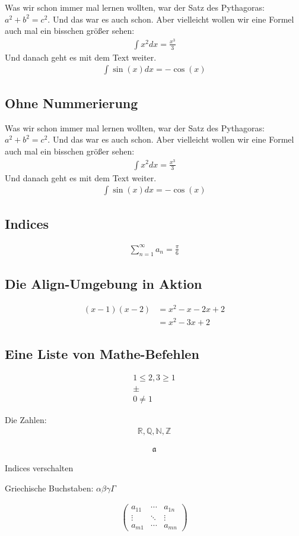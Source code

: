 \documentclass[a4paper,ngerman]{scrartcl} %
\begin{document}
Was wir schon immer mal lernen wollten, war der Satz des Pythagoras: $a^2+b^2=c^2$. Und das war es auch schon. Aber vielleicht wollen wir eine Formel auch mal ein bisschen größer sehen:
\begin{align}
\int x^2 dx = \frac{x^3}{3} 
\end{align}
Und danach geht es mit dem Text weiter.
\blindtext
\begin{align}
\int \sin (x) dx = - \cos(x)
\end{align}

\subsection{Ohne Nummerierung}

Was wir schon immer mal lernen wollten, war der Satz des Pythagoras: $a^2+b^2=c^2$. Und das war es auch schon. Aber vielleicht wollen wir eine Formel auch mal ein bisschen größer sehen:
\begin{align*}
\int x^2 dx = \frac{x^3}{3} 
\end{align*}
Und danach geht es mit dem Text weiter.
\blindtext
\begin{align*}
\int \sin (x) dx = - \cos(x)
\end{align*}

\subsection{Indices}
\begin{align}
\sum_{n=1}^\infty a_n = \frac{\pi}{6}
\end{align}


\subsection{Die Align-Umgebung in Aktion}
\begin{align}
(x-1)(x-2) &= x^2-x-2x+2\\
&= x^2-3x+2
\end{align} 

\subsection{Eine Liste von Mathe-Befehlen}
\begin{align}
1 \leq 2 , 3 \geq 1\\
\pm \\
0\neq 1
\end{align}

Die Zahlen:
\begin{align}
\mathbb{R}, \mathbb{Q}, \mathbb{N}, \mathbb{Z}
\end{align}

\begin{align}
\mathfrak{a}
\end{align}

Indices verschalten

Griechische Buchstaben: $\alpha \beta \gamma \Gamma$

\begin{align}
\left(
   \begin{array}{ccc}
     a_{11} & \cdots & a_{1n} \\
     \vdots & \ddots & \vdots \\
     a_{m1} & \cdots & a_{mn}
   \end{array}
\right)
\end{align}
\end{document}
